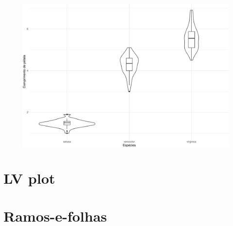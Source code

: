 \documentclass[
  10pt,
  ignorenonframetext,
]{beamer}
\begin{document}
\begin{frame}
\begin{figure}

{\centering \includegraphics[width=1\textwidth,height=\textheight]{exploracao-visualizacao_files/figure-beamer/unnamed-chunk-91-1.pdf}

}

\end{figure}
\end{frame}

\hypertarget{lv-plot}{%
\section{LV plot}\label{lv-plot}}

\hypertarget{ramos-e-folhas}{%
\section{Ramos-e-folhas}\label{ramos-e-folhas}}
\end{document}

